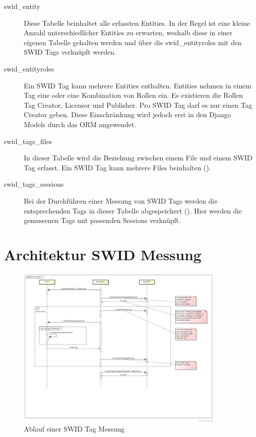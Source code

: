 \begin{description}
	
	\item[swid\_entity] Diese Tabelle beinhaltet alle erfassten Entities. In der
	Regel ist eine kleine Anzahl unterschiedlicher Entities zu erwarten, weshalb
	diese in einer eigenen Tabelle gehalten werden und über die swid\_entityroles
	mit den SWID Tags verknüpft werden.

	\item [swid\_entityroles] Ein SWID Tag kann mehrere Entities enthalten.
	Entities nehmen in einem Tag eine oder eine Kombination von Rollen ein. Es
	existieren die Rollen Tag Creator, Licensor und Publisher. Pro SWID Tag darf es
	nur einen Tag Creator geben. Diese Einschränkung wird jedoch erst in den Django
	Models durch das ORM angewendet.

	\item [swid\_tags\_files] In dieser Tabelle wird die Beziehung zwischen einem
	File und einem SWID Tag erfasst. Ein SWID Tag kann mehrere Files beinhalten
	().

	\item[swid\_tags\_sessions] Bei der Durchführen einer Messung von SWID Tags
	werden die entsprechenden Tags in dieser Tabelle abgespeichert
	(). Hier werden die gemessenen Tags mit passenden
	Sessions verknüpft.

\end{description}


\section{Architektur SWID Messung}

\begin{figure}[H]
	\centering
	\includegraphics[width=0.9\textwidth]{./images/architecture/SWID_strongTNC.png}
	\caption{Ablauf einer SWID Tag Messung}
	\label{fig:swid-measurement}
\end{figure}

